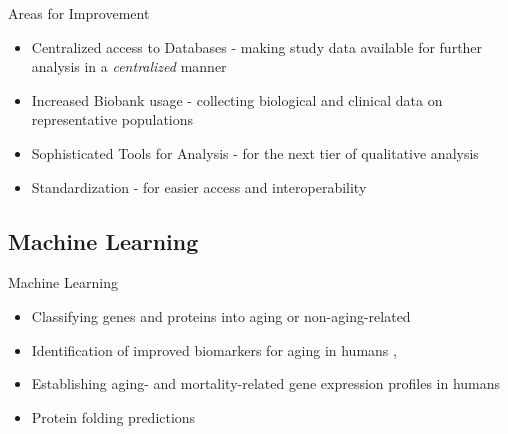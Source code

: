 \begin{frame}[c]{Areas for Improvement}
    \large
    \begin{itemize}[<+(1)->]
        \item Centralized access to Databases - making study data available for further analysis in a {\em centralized} manner
        \item Increased Biobank usage - collecting biological and clinical data on representative populations
        \item Sophisticated Tools for Analysis - for the next tier of qualitative analysis 
        \item Standardization - for easier access and interoperability
    \end{itemize}
\end{frame}


\subsection{Machine Learning}

\begin{frame}[c]{Machine Learning}
    \large
    \begin{itemize}[<+(1)->]
        \item Classifying genes and proteins into aging or non-aging-related \cite{townes2020identifying}
        \item Identification of improved biomarkers for aging in humans \cite{putin2016deep}, \cite{nakamura2007method}
        \item Establishing aging- and mortality-related gene expression profiles in humans \cite{kerber2009gene}
        \item Protein folding predictions \cite{jumper2021alphafold} \cite{baek2021rosetta}
    \end{itemize}
\end{frame}

